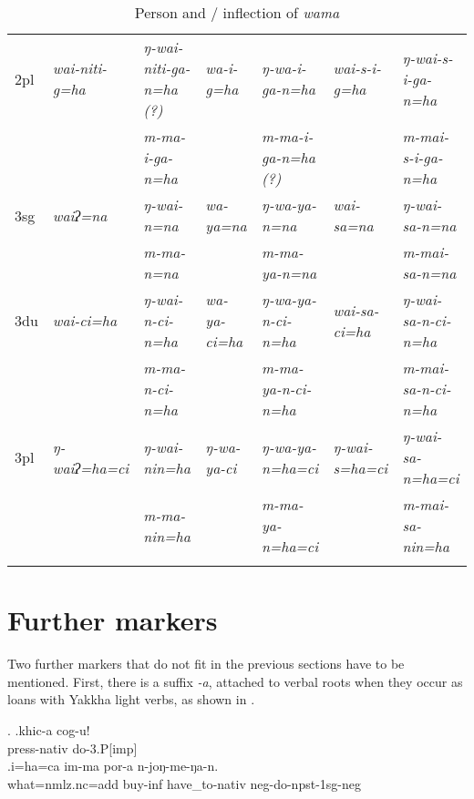 \begin{sidewaystable}
{\begin{tabular}{lllllll}
{\sc 2pl} & \it  wai-niti-g=ha & \it  ŋ-wai-niti-ga-n=ha (?)& \it  wa-i-g=ha	 & \it  ŋ-wa-i-ga-n=ha & \it  wai-s-i-g=ha & \it   ŋ-wai-s-i-ga-n=ha\\
 & \it   & \it  m-ma-i-ga-n=ha & \it   & \it  m-ma-i-ga-n=ha (?) & \it   & \it  m-mai-s-i-ga-n=ha\\
\midrule
{\sc 3sg} & \it   waiʔ=na	 & \it  ŋ-wai-n=na & \it  wa-ya=na	& \it  ŋ-wa-ya-n=na & \it  wai-sa=na & \it   ŋ-wai-sa-n=na\\
 & \it   & \it  m-ma-n=na & \it   & \it  m-ma-ya-n=na & \it   & \it  m-mai-sa-n=na\\
{\sc 3du} & \it  wai-ci=ha & \it  ŋ-wai-n-ci-n=ha	 & \it  wa-ya-ci=ha & \it  ŋ-wa-ya-n-ci-n=ha & \it  wai-sa-ci=ha & \it  ŋ-wai-sa-n-ci-n=ha\\
 & \it   & \it  m-ma-n-ci-n=ha & \it   & \it  m-ma-ya-n-ci-n=ha & \it   & \it  m-mai-sa-n-ci-n=ha\\
{\sc 3pl} & \it   ŋ-waiʔ=ha=ci & \it  ŋ-wai-nin=ha & \it  ŋ-wa-ya-ci & \it  ŋ-wa-ya-n=ha=ci & \it  ŋ-wai-s=ha=ci & \it  ŋ-wai-sa-n=ha=ci \\
 & \it   & \it  m-ma-nin=ha & \it   & \it  m-ma-ya-n=ha=ci & \it   & \it  m-mai-sa-nin=ha\\
\lspbottomrule
\end{tabular}
}
\caption{Person and / inflection of  \emph{wama} }\label{par-wa-ma}
\end{sidewaystable}




\section{Further markers}\label{furtherverbal}

Two further markers that do not fit in the previous sections have to be mentioned. First, there is a suffix \emph{-a}, attached to  verbal roots when they occur as loans with Yakkha light verbs, as shown in \Next.

\ex. \ag.khic-a cog-u!\\
press{\sc -nativ} do{\sc -3.P[imp]}\\
\bg.i=ha=ca im-ma por-a n-joŋ-me-ŋa-n.\\
what{\sc =nmlz.nc=add} buy{\sc -inf} have\_to{\sc -nativ} {\sc neg-}do{\sc -npst-1sg-neg}\\
 

